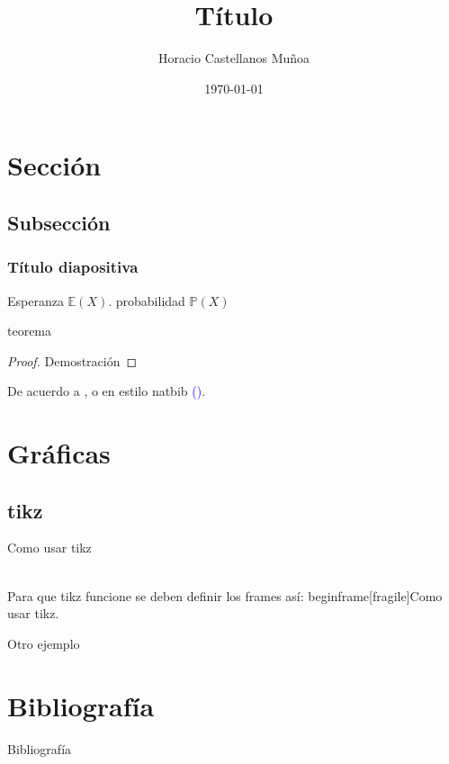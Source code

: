 \documentclass[fleqn]{beamer}
\title{Título}
\author{Horacio Castellanos Muñoa}
\institute[Universidad de Montevideo]{ }
\date{\today}
\newcommand{\esperanza}[1]{\mathbb{E}(#1)}
\newcommand{\proba}[1]{\mathbb{P}(#1)}
\newcommand{\citap}[1]{\textcolor{blue}{(\cite{#1})}}
\begin{document}
\begin{frame}
  \titlepage
\end{frame}

\section{Sección}
\subsection{Subsección}
\begin{frame}
  \frametitle{Título diapositiva}
  Esperanza $\esperanza{X}$. probabilidad $\proba{X}$ \begin{theorem} teorema
      
  \end{theorem}
  
  \begin{proof} Demostración \end{proof}

De acuerdo a \cite{dirac}, o en estilo natbib \citap{dirac}.
\end{frame}

\section{Gráficas}
\subsection{tikz}

\begin{frame}[fragile]{Como usar tikz}

\\
Para que tikz funcione se deben definir los frames así: begin{frame}[fragile]{Como usar tikz}.

\end{frame}

\begin{frame}[fragile]{Otro ejemplo}
    \begin{center}
    


\end{center}
\end{frame}

\section{Bibliografía}
\begin{frame}{Bibliografía}
\nocite{*}
\printbibliography
\end{frame}
\end{document}
